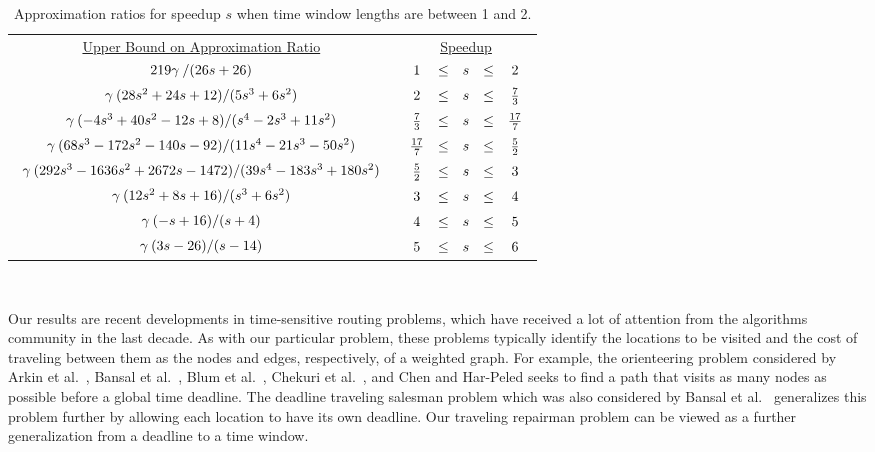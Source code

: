 \documentclass[11pt]{article}
\begin{document}
\begin{table}[!hbt]
\begin{center}
\begin{tabular}{cc}
\underline{Upper Bound on Approximation Ratio} & \underline{Speedup} \medskip \\
$\begin{array}{c}
219\gamma\: /(26s+26)\medskip \\
\gamma\: (28s^2 + 24s + 12)/(5s^3 + 6s^2) \medskip \\
\gamma\: (-4s^3 + 40s^2 -12s + 8)/(s^4 - 2s^3 + 11s^2) \medskip \\
\gamma\: (68s^3 - 172s^2 - 140s - 92)/(11s^4 -21s^3 - 50s^2) \medskip \\
\gamma\: (292s^3-1636s^2+2672s-1472)/(39s^4-183s^3+180s^2) \medskip \\
\gamma\: (12s^2+8s+16)/(s^3+6s^2) \medskip \\
\gamma\: (-s + 16)/(s+4) \medskip \\
\gamma\: (3s - 26) /(s - 14)
\end{array}$ &
$\begin{array}{crclc}
1& \leq &s&  \leq &2 \medskip \\
2& \leq &s&  \leq &{7 \over 3} \medskip \\
{7 \over 3}& \leq &s&  \leq &{17 \over 7} \medskip \\
{17 \over 7}& \leq &s&  \leq &{5 \over 2} \medskip \\
{5 \over 2}& \leq &s&  \leq &3 \medskip \\
3& \leq &s& \leq &4 \medskip \\
4& \leq &s& \leq &5 \medskip \\
5& \leq &s& \leq &6
\end{array}$
\end{tabular}\\
\caption{Approximation ratios for speedup $s$ when time window lengths are between 1 and 2.}
\label{table:speedupw12rats}
\end{center}
\end{table}

Our results are recent developments in time-sensitive routing problems, which have received a lot of attention from the algorithms community in the last decade.  As with our particular problem, these problems typically identify the locations to be visited and the cost of traveling between them as the nodes and edges, respectively, of a weighted graph.  For example, the orienteering problem considered by Arkin et al.~\cite{Arkin}, Bansal et al.~\cite{Bansal}, Blum et al.~\cite{Blum3}, Chekuri et al.~\cite{Chekuri2}, and Chen and Har-Peled \cite{Chen} seeks to find a path that visits as many nodes as possible before a global time deadline.  The deadline traveling salesman problem which was also considered by Bansal et al.~\cite{Bansal} generalizes this problem further by allowing each location to have its own deadline.  Our traveling repairman problem can be viewed as a further generalization from a deadline to a time window.  
\end{document}
